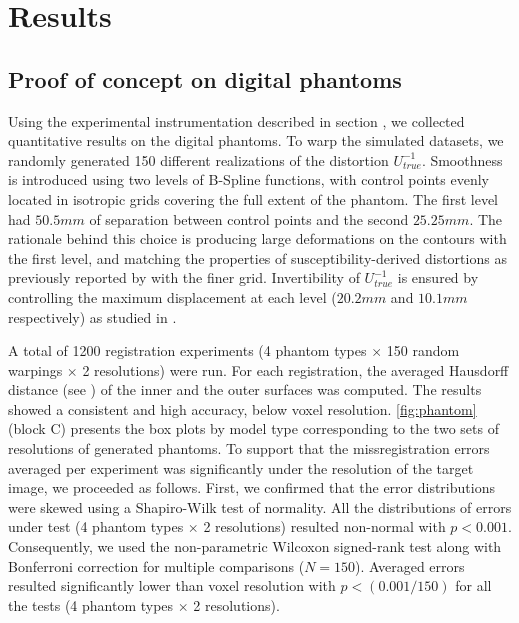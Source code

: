 \section*{Results}
\label{sec:results}

\subsection*{Proof of concept on digital phantoms}
\label{sec:results_phantom}
Using the experimental instrumentation described in section ,
  we collected quantitative results on the digital phantoms.
To warp the simulated datasets, we randomly generated 150 different realizations of
  the distortion $U^{-1}_{true}$.
Smoothness is introduced using two levels of B-Spline functions, with control points evenly
  located in isotropic grids covering the full extent of the phantom.
The first level had $50.5mm$ of separation between control points and the second $25.25mm$.
The rationale behind this choice is producing large deformations on the contours with
  the first level, and matching the properties of susceptibility-derived distortions
  as previously reported by \cite{irfanoglu_susceptibility_2011} with the finer grid.
Invertibility of $U^{-1}_{true}$ is ensured by controlling the maximum displacement at each
  level ($20.2mm$ and $10.1mm$ respectively) as studied in \citep{rueckert_diffeomorphic_2006}.

A total of 1200 registration experiments (4 phantom types $\times$ 150 random warpings
  $\times$ 2 resolutions) were run.
For each registration, the averaged Hausdorff distance (see )
  of the inner and the outer surfaces was computed.
The results showed a consistent and high accuracy, below voxel resolution.
\autoref{fig:phantom} (block C) presents the box plots by model type corresponding
  to the two sets of resolutions of generated phantoms.
To support that the missregistration errors averaged per experiment was significantly
  under the resolution of the target image, we proceeded as follows.
First, we confirmed that the error distributions were skewed using a Shapiro-Wilk test of
  normality.
All the distributions of errors under test (4 phantom types $\times$ 2 resolutions) resulted
  non-normal with $p<0.001$.
Consequently, we used the non-parametric Wilcoxon signed-rank test along with Bonferroni
  correction for multiple comparisons ($N=150$).
Averaged errors resulted significantly lower than voxel resolution with $p < (0.001 / 150)$
  for all the tests (4 phantom types $\times$ 2 resolutions).


